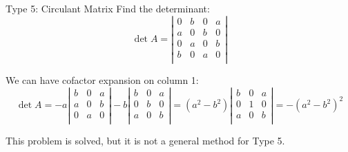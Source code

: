 \documentclass{beamer}
\begin{document}
\begin{frame}{Type 5: Circulant Matrix}
Find the determinant:
\begin{equation*}
\det A=\left| \begin{matrix}
	0&		b&		0&		a\\
	a&		0&		b&		0\\
	0&		a&		0&		b\\
	b&		0&		a&		0\\
\end{matrix} \right|
\end{equation*}

We can have cofactor expansion on column 1:
\begin{equation*}
    \det A=-a\left| \begin{matrix}
        b&		0&		a\\
        a&		0&		b\\
        0&		a&		0\\
    \end{matrix} \right|-b\left| \begin{matrix}
        b&		0&		a\\
        0&		b&		0\\
        a&		0&		b\\
    \end{matrix} \right|=\left( a^2-b^2 \right) \left| \begin{matrix}
        b&		0&		a\\
        0&		1&		0\\
        a&		0&		b\\
    \end{matrix} \right|=-\left( a^2-b^2 \right) ^2
\end{equation*}

This problem is solved, but it is not a general method for Type 5.

\end{frame}
\end{document}

